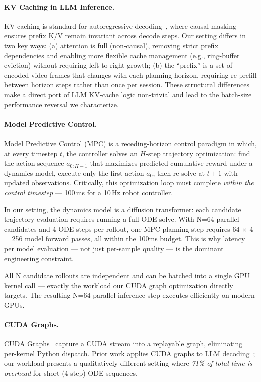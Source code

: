 \documentclass[letterpaper,twocolumn,10pt]{article}
\begin{document}
\paragraph{KV Caching in LLM Inference.}
KV caching is standard for autoregressive decoding~\cite{openai2019gpt3}, where causal masking ensures prefix K/V remain invariant across decode steps. Our setting differs in two key ways: (a) attention is full (non-causal), removing strict prefix dependencies and enabling more flexible cache management (e.g., ring-buffer eviction) without requiring left-to-right growth; (b) the “prefix” is a set of encoded video frames that changes with each planning horizon, requiring re-prefill between horizon steps rather than once per session. These structural differences make a direct port of LLM KV-cache logic non-trivial and lead to the batch-size performance reversal we characterize.


\paragraph{Model Predictive Control.}
Model Predictive Control (MPC) is a receding-horizon control paradigm
in which, at every timestep $t$, the controller solves an $H$-step
trajectory optimization: find the action sequence
$a_{0:H-1}$ that maximizes predicted cumulative reward under a
dynamics model, execute only the first action $a_0$, then re-solve at
$t{+}1$ with updated observations.  Critically, this optimization loop
must complete \emph{within the control timestep} --- 100\,ms for a
10\,Hz robot controller.

In our setting, the dynamics model is a diffusion transformer: each
candidate trajectory evaluation requires running a full ODE solve.  With N=64 parallel candidates and 4 ODE
steps per rollout, one MPC planning step requires
64 $\times$ 4 = 256 model forward passes, all within the 100ms
budget.  This is why latency per model evaluation --- not just
per-sample quality --- is the dominant engineering constraint.

All N
candidate rollouts are independent and can be batched into a single GPU
kernel call --- exactly the workload our CUDA graph optimization
directly targets.  The resulting N=64 parallel inference step executes
efficiently on modern GPUs.

\paragraph{CUDA Graphs.}
CUDA Graphs~\cite{cudagraphs} capture a CUDA stream into a replayable
graph, eliminating per-kernel Python dispatch.  Prior work applies
CUDA graphs to LLM decoding~\cite{vllm2023}; our workload presents a qualitatively different setting where
\emph{71\% of total time is overhead} for short (4 step) ODE
sequences.
\end{document}
